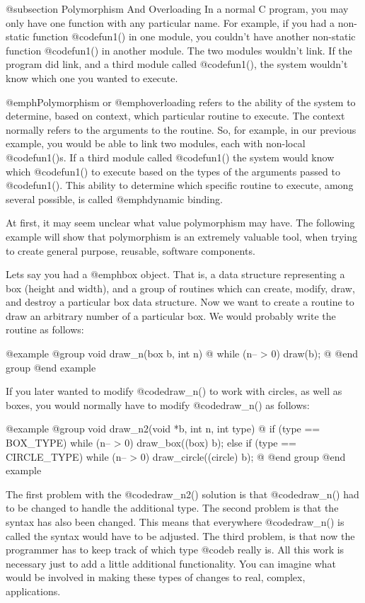 @subsection Polymorphism And Overloading
In a normal C program, you may only have one function with any particular
name.  For example, if you had a non-static function @code{fun1()} in one
module, you couldn't have another non-static function @code{fun1()} in
another module.  The two modules wouldn't link.  If the program did
link, and a third module called @code{fun1()}, the system wouldn't know
which one you wanted to execute.

@emph{Polymorphism} or @emph{overloading} refers to the ability of the
system to determine, based on context, which particular routine to
execute.  The context normally refers to the arguments to the routine.
So, for example, in our previous example, you would be able to link two
modules, each with non-local @code{fun1()}s.  If a third module called
@code{fun1()} the system would know which @code{fun1()} to execute based
on the types of the arguments passed to @code{fun1()}.  This ability to
determine which specific routine to execute, among several possible, is
called @emph{dynamic binding}.

At first, it may seem unclear what value polymorphism may have.  The
following example will show that polymorphism is an extremely valuable
tool, when trying to create general purpose, reusable, software
components.

Lets say you had a @emph{box} object.  That is, a data structure
representing a box (height and width), and a group of routines which
can create, modify, draw, and destroy a particular box data structure.
Now we want to create a routine to draw an arbitrary number of a
particular box.  We would probably write the routine as follows:

@example
@group
void    draw_n(box b, int n)
@{
        while (n-- > 0)
                draw(b);
@}
@end group
@end example

If you later wanted to modify @code{draw_n()} to work with circles, as
well as boxes, you would normally have to modify @code{draw_n()} as follows:

@example
@group
void    draw_n2(void *b, int n, int type)
@{
        if (type == BOX_TYPE)
                while (n-- > 0)
                        draw_box((box) b);
        else if (type == CIRCLE_TYPE)
                while (n-- > 0)
                        draw_circle((circle) b);
@}
@end group
@end example

The first problem with the @code{draw_n2()} solution is that @code{draw_n()}
had to be changed to handle the additional type.  The second problem is that
the syntax has also been changed.  This means that everywhere @code{draw_n()}
is called the syntax would have to be adjusted.  The third problem, is that
now the programmer has to keep track of which type @code{b} really is.
All this work is necessary just to add a little additional functionality.
You can imagine what would be involved in making these types of changes
to real, complex, applications.

